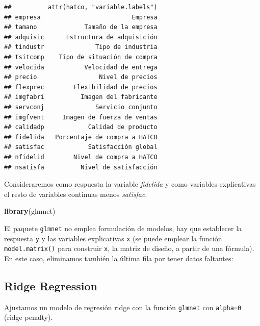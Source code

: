 \documentclass[]{book}
\newenvironment{Shaded}{\begin{snugshade}}{\end{snugshade}}
\newcommand{\KeywordTok}[1]{\textcolor[rgb]{0.13,0.29,0.53}{\textbf{#1}}}
\newcommand{\DecValTok}[1]{\textcolor[rgb]{0.00,0.00,0.81}{#1}}
\newcommand{\StringTok}[1]{\textcolor[rgb]{0.31,0.60,0.02}{#1}}
\newcommand{\OperatorTok}[1]{\textcolor[rgb]{0.81,0.36,0.00}{\textbf{#1}}}
\newcommand{\NormalTok}[1]{#1}
\begin{document}
\begin{verbatim}
##          attr(hatco, "variable.labels")
## empresa                         Empresa
## tamano             Tamaño de la empresa
## adquisic      Estructura de adquisición
## tindustr              Tipo de industria
## tsitcomp    Tipo de situación de compra
## velocida           Velocidad de entrega
## precio                 Nivel de precios
## flexprec        Flexibilidad de precios
## imgfabri          Imagen del fabricante
## servconj              Servicio conjunto
## imgfvent     Imagen de fuerza de ventas
## calidadp            Calidad de producto
## fidelida   Porcentaje de compra a HATCO
## satisfac            Satisfacción global
## nfidelid        Nivel de compra a HATCO
## nsatisfa          Nivel de satisfacción
\end{verbatim}

Consideraremos como respuesta la variable \emph{fidelida} y como
variables explicativas el resto de variables continuas menos
\emph{satisfac}.

\begin{Shaded}
\begin{Highlighting}[]
\KeywordTok{library}\NormalTok{(glmnet)}
\end{Highlighting}
\end{Shaded}

El paquete \texttt{glmnet} no emplea formulación de modelos, hay que
establecer la respuesta \texttt{y} y las variables explicativas
\texttt{x} (se puede emplear la función \texttt{model.matrix()} para
construir \texttt{x}, la matriz de diseño, a partir de una fórmula). En
este caso, eliminamos también la última fila por tener datos faltantes:

\begin{Shaded}
\end{Shaded}

\subsection{Ridge Regression}\label{ridge-regression}

Ajustamos un modelo de regresión ridge con la función \texttt{glmnet}
con \texttt{alpha=0} (ridge penalty).
\end{document}

